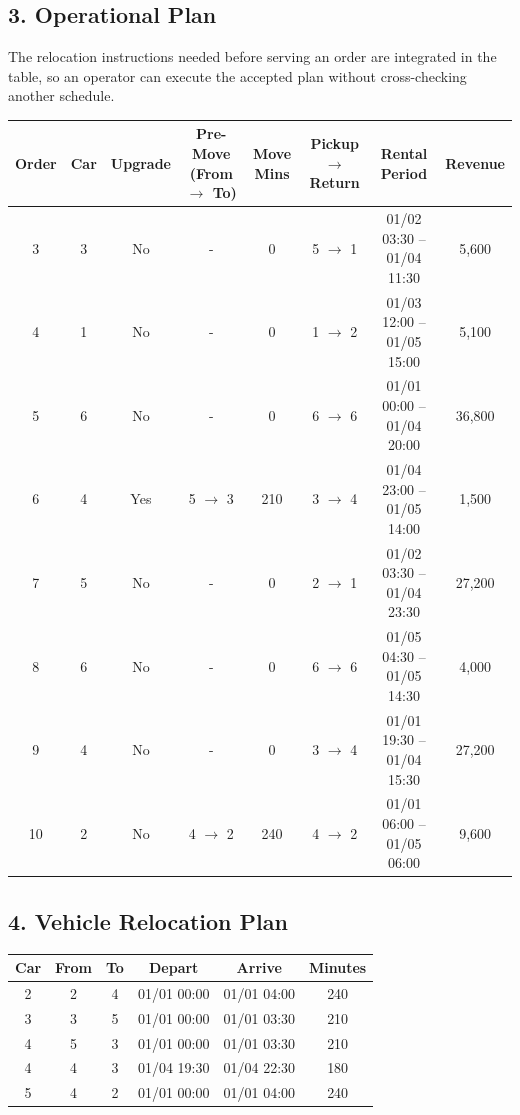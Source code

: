 \documentclass[10pt,a4paper]{article}
\begin{document}
\subsection*{3. Operational Plan}

The relocation instructions needed before serving an order are integrated in
the table, so an operator can execute the accepted plan without cross-checking
another schedule.

\begingroup
\scriptsize
\begin{longtable}{cccccccc}
\toprule
Order & Car & Upgrade & Pre-Move (From $\to$ To) & Move Mins
& Pickup $\rightarrow$ Return & Rental Period & Revenue \\
\midrule
3 & 3 & No & - & 0 & 5 $\rightarrow$ 1 & 01/02 03:30 -- 01/04 11:30 & 5,600 \\
4 & 1 & No & - & 0 & 1 $\rightarrow$ 2 & 01/03 12:00 -- 01/05 15:00 & 5,100 \\
5 & 6 & No & - & 0 & 6 $\rightarrow$ 6 & 01/01 00:00 -- 01/04 20:00 & 36,800 \\
6 & 4 & Yes & 5 $\rightarrow$ 3 & 210 & 3 $\rightarrow$ 4 & 01/04 23:00 -- 01/05 14:00 & 1,500 \\
7 & 5 & No & - & 0 & 2 $\rightarrow$ 1 & 01/02 03:30 -- 01/04 23:30 & 27,200 \\
8 & 6 & No & - & 0 & 6 $\rightarrow$ 6 & 01/05 04:30 -- 01/05 14:30 & 4,000 \\
9 & 4 & No & - & 0 & 3 $\rightarrow$ 4 & 01/01 19:30 -- 01/04 15:30 & 27,200 \\
10 & 2 & No & 4 $\rightarrow$ 2 & 240 & 4 $\rightarrow$ 2 & 01/01 06:00 -- 01/05 06:00 & 9,600 \\
\bottomrule
\end{longtable}
\endgroup

\vspace{0.2cm}

\subsection*{4. Vehicle Relocation Plan}

\begin{table}[ht]
\centering
\small
\begin{tabular}{cccccc}
\toprule
Car & From & To & Depart & Arrive & Minutes \\
\midrule
2 & 2 & 4 & 01/01 00:00 & 01/01 04:00 & 240 \\
3 & 3 & 5 & 01/01 00:00 & 01/01 03:30 & 210 \\
4 & 5 & 3 & 01/01 00:00 & 01/01 03:30 & 210 \\
4 & 4 & 3 & 01/04 19:30 & 01/04 22:30 & 180 \\
5 & 4 & 2 & 01/01 00:00 & 01/01 04:00 & 240 \\
\bottomrule
\end{tabular}
\end{table}
\end{document}
